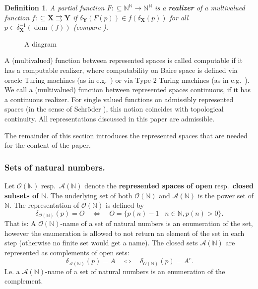 \documentclass{eptcs-modified}
\newtheorem{definition}[theorem]{Definition}
\newcommand{\dom}{\operatorname{dom}}
\newcommand{\Baire}{{\mathbb{N}^\mathbb{N}}}
\newcommand{\mto}{\rightrightarrows}
\newcommand{\demph}{\textbf}
\newcommand{\NN}{\mathbb{N}}
\newcommand{\OO}{\mathcal{O}}
\newcommand{\XX}{\mathbf{X}}
\newcommand{\YY}{\mathbf{Y}}
\newcommand{\A}{\mathcal A}
\begin{document}
			\begin{definition}
				A partial function $F : \subseteq \Baire \to \Baire$ is a \demph{realizer} of a multivalued function $f : \subseteq\mathbf{X} \mto \mathbf{Y}$ if $\delta_\mathbf{Y}(F(p)) \in f(\delta_\mathbf{X}(p))$ for all $p \in \delta_{\XX}^{-1}(\dom(f))$ (compare ).
			\end{definition}
			
			\begin{wrapfigure}{r}{3.4cm}
				\vspace{-.5cm}
				\caption{A diagram}\label{figure:diagram}
				\vspace{-.8cm}
			\end{wrapfigure}
			A (multivalued) function between represented spaces is called computable if it has a computable realizer, where computability on Baire space is defined via oracle Turing machines (as in e.g.~\cite{MR1673610}) or via Type-2 Turing machines (as in e.g.~\cite{MR1795407}).
			We call a (multivalued) function between represented spaces continuous, if it has a continuous realizer.
			For single valued functions on admissibly represented spaces (in the sense of Schr\"oder \cite{schroder}), this notion coincides with topological continuity.
			All representations discussed in this paper are admissible.		

			The remainder of this section introduces the represented spaces that are needed for the content of the paper.

			\subsubsection*{Sets of natural numbers.}

				Let $\OO(\NN)$ resp.\ $\A(\NN)$ denote the \demph{represented spaces of open} resp.\ \demph{closed subsets of $\NN$}.
				The underlying set of both $\OO(\NN)$ and $\A(\NN)$ is the power set of $\NN$.
				The representation of $\OO(\NN)$ is defined by
				\[ \delta_{\OO(\NN)}(p) = O \quad\Leftrightarrow\quad O = \{p(n)-1\mid n\in\NN, p(n) > 0\}. \]
				That is: A $\OO(\NN)$-name of a set of natural numbers is an enumeration of the set, however the enumeration is allowed to not return an element of the set in each step (otherwise no finite set would get a name).
				The closed sets $\A(\NN)$ are represented as complements of open sets:
				\[ \delta_{\A(\NN)}(p) = A \quad\Leftrightarrow\quad \delta_{\OO(\NN)}(p) = A^c. \]
				I.e. a $\A(\NN)$-name of a set of natural numbers is an enumeration of the complement.
		
\end{document}
